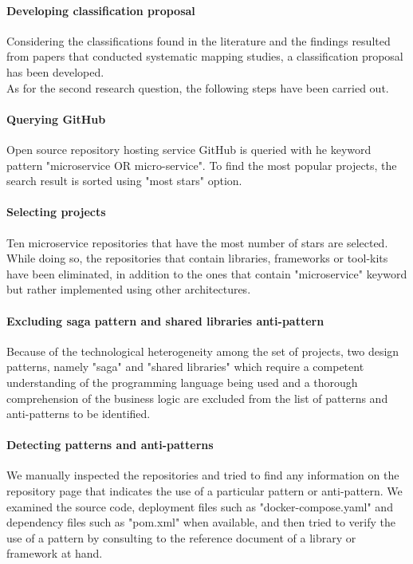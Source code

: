 \documentclass[11pt,a4paper,twocolumn]{article}
\begin{document}
\paragraph{Developing classification proposal}
Considering the classifications found in the literature and the findings resulted from papers that conducted systematic mapping studies, a classification proposal has been developed.\\

As for the second research question, the following steps have been carried out.

\paragraph{Querying GitHub}
Open source repository hosting service GitHub is queried with he keyword pattern "microservice OR micro-service". 
To find the most popular projects, the search result is sorted using "most stars" option.

\paragraph{Selecting projects}
Ten microservice repositories that have the most number of stars are selected.
While doing so, the repositories that contain libraries, frameworks or tool-kits have been eliminated, in addition to the ones that contain "microservice" keyword but rather implemented using other architectures.

\paragraph{Excluding saga pattern and shared libraries anti-pattern}
Because of the technological heterogeneity among the set of projects, two design patterns, namely "saga" and "shared libraries" which require a competent understanding of the programming language being used and a thorough comprehension of the business logic are excluded from the list of patterns and anti-patterns to be identified.

\paragraph{Detecting patterns and anti-patterns}
We manually inspected the repositories and tried to find any information on the repository page that indicates the use of a particular pattern or anti-pattern. We examined the source code, deployment files such as "docker-compose.yaml" and dependency files such as "pom.xml" when available, and then tried to verify the use of a pattern by consulting to the reference document of a library or framework at hand.
\end{document}
